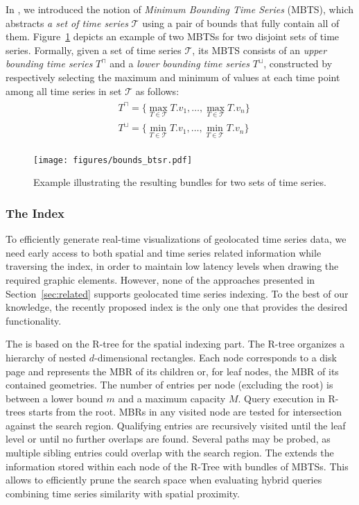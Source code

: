 In \cite{chatzig17btsr}, we introduced the notion of {\em Minimum Bounding Time Series} (MBTS), which abstracts {\em a set of time series}  $\mathcal{T}$ using a pair of bounds that fully contain all of them.  Figure~\ref{fig:example_bundle} depicts an example of two MBTSs for two disjoint sets of time series. Formally, given a set of time series $\mathcal{T}$, its MBTS consists of an \emph{upper bounding time series} $T^{\sqcap}$ and a \emph{lower bounding time series} $T^{\sqcup}$, constructed by respectively selecting the maximum and minimum of values at each time point among all time series in set $\mathcal{T}$ as follows:
\begin{align}\label{eq:bounds1}
 \begin{split}
  & T^{\sqcap} = \{ \max_{T \in \mathcal{T}} T.v_1, \ldots, \max_{T \in \mathcal{T}} T.v_{n} \} \\
  & T^{\sqcup} = \{ \min_{T \in \mathcal{T}} T.v_1, \ldots, \min_{T \in \mathcal{T}} T.v_{n} \}
 \end{split}
\end{align}

\begin{figure}[t]
	\centering
	\texttt{[image: figures/bounds\_btsr.pdf]}
	\caption{Example illustrating the resulting bundles for two sets of time series.}
	\label{fig:example_bundle}
\end{figure}

\subsubsection{The \btsr Index}
\label{subsec:btsr}

To efficiently generate real-time visualizations of geolocated time series data, we need early access to both spatial and time series related information while traversing the index, in order to maintain low latency levels when drawing the required graphic elements. However, none of the approaches presented in Section~\ref{sec:related} supports geolocated time series indexing. To the best of our knowledge, the recently proposed \btsr index \cite{chatzig17btsr} is the only one that provides the desired functionality. 

The \btsr is based on the R-tree \cite{Guttman1984} for the spatial indexing part. The R-tree organizes a hierarchy of nested $d$-dimensional rectangles. Each node corresponds to a disk page and represents the MBR of its children or, for leaf nodes, the MBR of its contained geometries. The number of entries per node (excluding the root) is between a lower bound $m$ and a maximum capacity $M$. Query execution in R-trees starts from the root. MBRs in any visited node are tested for intersection against the search region. Qualifying entries are recursively visited until the leaf level or until no further overlaps are found. Several paths may be probed, as multiple sibling entries could overlap with the search region. The \btsr extends the information stored within each node of the R-Tree with bundles of MBTSs. This allows to efficiently prune the search space when evaluating hybrid queries combining time series similarity with spatial proximity.


